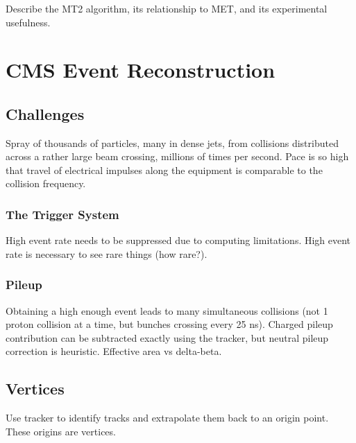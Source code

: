     \subsubsection{\mttwo} \label{sec:MT2}

    Describe the MT2 algorithm, its relationship to MET, and its experimental usefulness.

\section{CMS Event Reconstruction} \label{sec:reconstruction}

  \subsection{Challenges} \label{sec:challenges}

  Spray of thousands of particles, many in dense jets, from collisions distributed across a rather large beam crossing, millions of times per second.
  Pace is so high that travel of electrical impulses along the equipment is comparable to the collision frequency.

    \subsubsection{The Trigger System} \label{sec:trigger}

    High event rate needs to be suppressed due to computing limitations.
    High event rate is necessary to see rare things (how rare?).

    \subsubsection{Pileup} \label{sec:pileup}

    Obtaining a high enough event leads to many simultaneous collisions (not 1 proton collision at a time, but bunches crossing every 25 ns).
    Charged pileup contribution can be subtracted exactly using the tracker, but neutral pileup correction is heuristic.
    Effective area vs delta-beta.

  \subsection{Vertices} \label{sec:vertices}

  Use tracker to identify tracks and extrapolate them back to an origin point.
  These origins are vertices.

